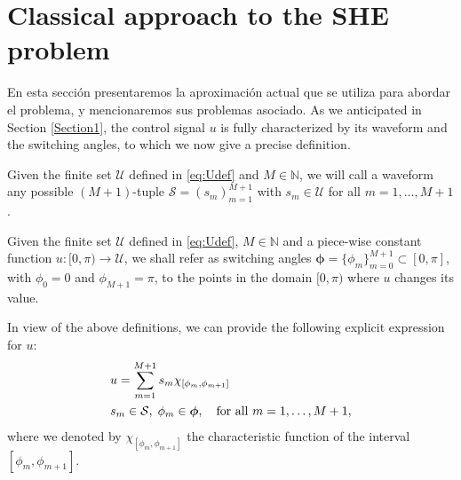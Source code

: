 
\section{Classical approach to the SHE problem}

En esta sección presentaremos la aproximación actual que se utiliza para abordar el problema, y mencionaremos sus problemas asociado. As we anticipated in Section \ref{Section1}, the control signal $u$ is fully characterized by its waveform and the switching angles, to which we now give a precise definition.
\newline
\begin{definition}\label{def:waveform}
Given the finite set $\mathcal U$ defined in \eqref{eq:Udef} and $M\in\mathbb{N}$, we will call a waveform any possible $(M+1)$-tuple $\mathcal S = (s_m)_{m=1}^{M+1}$ with $s_m\in \mathcal U$ for all $m=1,\ldots,M+1$.
\end{definition}
\vspace{1em}
\begin{definition}\label{def:switchingAngles}
Given the finite set $\mathcal U$ defined in \eqref{eq:Udef}, $M\in\mathbb{N}$ and a piece-wise constant function $u:[0,\pi) \rightarrow \mathcal{U}$, we shall refer as switching angles $\bm{\phi} = \{\phi_m\}_{m=0}^{M+1}\subset[0,\pi]$, with $\phi_0 = 0$ and $\phi_{M+1} = \pi$, to the points in the domain $[0,\pi)$ where $u$ changes its value. 
\end{definition} 

In view of the above definitions, we can provide the following explicit expression for $u$:
\begin{align}\label{eq:uExpl}
	&u = \sum_{m=1}^{M+1} s_m\chi_{[\phi_m,\phi_{m+1}]}
	\\
	&s_m\in\mathcal S, \;\phi_m\in{\bm{\phi}}, \quad \mbox{for all } m=1,\ldots,M+1, \notag 
\end{align} 
where we denoted by $\chi_{[\phi_m,\phi_{m+1}]}$ the characteristic function of the interval $[\phi_m,\phi_{m+1}]$.


